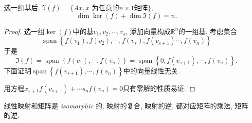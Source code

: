 \begin{proposition}
    选一组基后, $\Im (f) = \{ Ax, x \text{ 为任意的$n \times 1$矩阵} \}$, 
    \begin{equation}
      \operatorname{dim} \ker (f) + \operatorname{dim} \Im (f) = n.
    \end{equation}
\end{proposition}
\begin{proof}
    选一组$\ker (f)$中的基$v_1,v_2,\cdots,v_s$, 添加向量构成$\mathbb{R}^{n}$的一组基, 考虑集合
    \begin{equation}
      \operatorname{span} \left\{ f(v_1),f(v_2), \cdots, f(v_{s}), f(v_{s+1}) \cdots,f(v_n) \right\} 
    \end{equation}
    于是
    \begin{equation}
      \Im (f) = \operatorname{span} \left\{ f(v_1), \cdots, f(v_n) \right\} =\operatorname{span} \left\{ 0, f(v_{s+1}), \cdots, f(v_n) \right\}  .
    \end{equation}
    下面证明$\operatorname{span} \left\{ f(v_{s+1}), \cdots, f(v_n) \right\} $中的向量线性无关. 
    
    用方程$x_{s+1} f(v_{s+1}) + \cdots s_n f(v_n) = 0$只有零解的性质易证.
\end{proof}

线性映射和矩阵是 \emph{isomorphic} 的, 映射的复合, 映射的逆, 都对应矩阵的乘法, 矩阵的逆.
